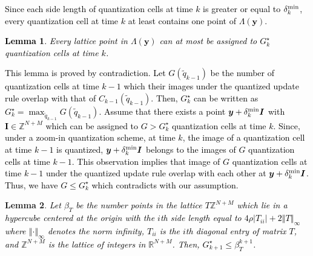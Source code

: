 \documentclass[10pt,twocolumn,twoside]{IEEEtran}
\newtheorem{lemma}{Lemma}
\begin{document}
\textcolor{black}{Since each side length of quantization cells at time $k$ is greater or equal to $\delta^{\rm min}_k$, every quantization cell at time $k$ at least contains one point of $\Lambda{\left({{\ensuremath{\boldsymbol{{y}}}}}\right)}$. 
\begin{lemma}\label{Lem: NLP-aux}
Every lattice point in $\Lambda{\left({{\ensuremath{\boldsymbol{{y}}}}}\right)}$ can at most  be assigned to $G^\star_k$ quantization cells at time $k$.
\end{lemma}}
\begin{IEEEproof}
\textcolor{black}{This lemma is proved by contradiction. Let $G{\left({{\tilde{q}_{k-1}}}\right)}$ be the number of  quantization cells at time $k-1$ which their images under the quantized update rule overlap with that of $C_{k-1}{\left({\tilde{q}_{k-1}}\right)}$. Then, $G^\star_{k}$ can be written as $G^\star_{k}=\max_{\tilde{q}_{k-1}}G{\left({{\tilde{q}_{k-1}}}\right)}$. Assume that there exists a point ${\ensuremath{\boldsymbol{{y}}}}+\delta^{\rm min}_k{\ensuremath{\boldsymbol{{I}}}}$ with ${\ensuremath{\boldsymbol{{I}}}}\in{\ensuremath{{\ensuremath{\mathbb{{Z}}}}}}^{N+M}$ which can be assigned to $G>G^\star_k$ quantization cells at time $k$. Since, under a zoom-in quantization scheme, at time $k$, the image of a quantization cell at time $k-1$ is quantized, ${\ensuremath{\boldsymbol{{y}}}}+\delta^{\rm min}_k{\ensuremath{\boldsymbol{{I}}}}$ belongs to the images of $G$ quantization cells at time $k-1$. This observation implies that image of $G$ quantization cells at time $k-1$ under the quantized update rule overlap with each other at ${\ensuremath{\boldsymbol{{y}}}}+\delta^{\rm min}_k{\ensuremath{\boldsymbol{{I}}}}$. Thus, we have  $G\leq G^\star_k$ which contradicts with our assumption. }
\end{IEEEproof}
\begin{lemma}\label{Lem: NLP}
\textcolor{black}{Let $\beta_T$ be the number points in the lattice $T{\ensuremath{{\ensuremath{\mathbb{{Z}}}}}}^{N+M}$ which lie in a hypercube centered at the origin with the $i$th side length equal to $4\rho{\left|{T_{ii}}\right|}+2{\left\Vert{T}\right\Vert_{{\infty}}}$ where ${\left\Vert{\cdot}\right\Vert_{{\infty}}}$ denotes the norm infinity, $T_{ii}$ is the $i$th diagonal entry of matrix $T$, and ${\ensuremath{{\ensuremath{\mathbb{{Z}}}}}}^{N+M}$ is the lattice of integers in ${\ensuremath{{\ensuremath{\mathbb{{R}}}}}}^{N+M}$. 
Then, $G^\star_{k+1}\leq \beta_T^{k+1}$.}
\end{lemma}
\end{document}
